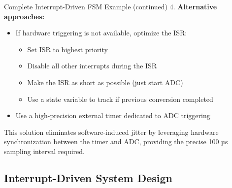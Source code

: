 \begin{example2}{Complete Interrupt-Driven FSM Example (continued)}
4. \textbf{Alternative approaches:}
   \begin{itemize}
     \item If hardware triggering is not available, optimize the ISR:
     \begin{itemize}
       \item Set ISR to highest priority
       \item Disable all other interrupts during the ISR
       \item Make the ISR as short as possible (just start ADC)
       \item Use a state variable to track if previous conversion completed
     \end{itemize}
     \item Use a high-precision external timer dedicated to ADC triggering
   \end{itemize}

This solution eliminates software-induced jitter by leveraging hardware synchronization between the timer and ADC, providing the precise 100 µs sampling interval required.
\end{example2}

\subsection{Interrupt-Driven System Design}

